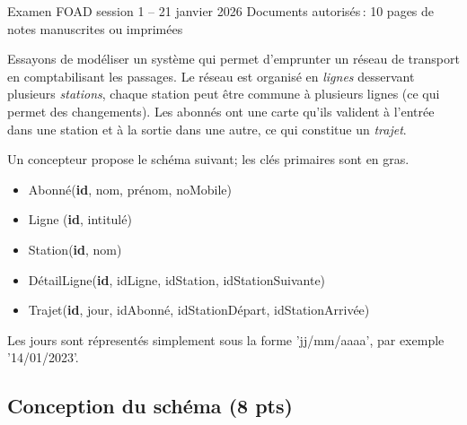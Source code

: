 %
{Examen FOAD session 1 -- 21 janvier 2026}%
{Documents autorisés\,: 10 pages de notes manuscrites ou imprimées}%

Essayons de modéliser un système  qui permet d'emprunter 
un réseau de transport en comptabilisant les passages. Le réseau
est organisé en \emph{lignes} desservant plusieurs \emph{stations}, chaque station peut être commune
à plusieurs lignes (ce qui permet des changements). Les abonnés ont une carte
qu'ils valident à l'entrée dans une station et à la sortie dans une autre, ce qui
constitue un \emph{trajet}. 


Un concepteur propose le schéma suivant; les clés primaires sont en gras.

\begin{itemize}
\item Abonné(\textbf{id}, nom, prénom, noMobile)
\item Ligne (\textbf{id}, intitulé)
\item Station(\textbf{id}, nom)
\item DétailLigne(\textbf{id}, idLigne, idStation, idStationSuivante)
\item Trajet(\textbf{id}, jour, idAbonné, idStationDépart, idStationArrivée)
\end{itemize}


Les jours sont répresentés simplement sous la forme 'jj/mm/aaaa', par exemple '14/01/2023'.

\subsection*{Conception du schéma (8 pts)}

